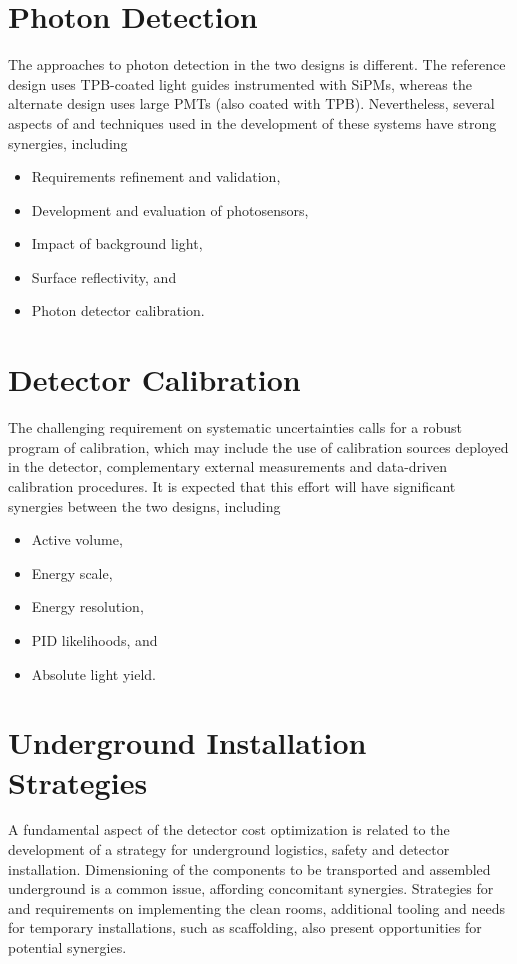  
\section{Photon Detection}

The approaches to photon detection in the two designs is
different.  The reference design uses TPB-coated light guides
instrumented with SiPMs, whereas the alternate design uses large PMTs
(also coated with TPB). Nevertheless, several aspects of and
techniques used in the development of these systems have strong synergies, including
\begin{itemize}
\item Requirements refinement and validation,
\item Development and evaluation of photosensors,
\item Impact of background light,
\item  Surface reflectivity, and
\item Photon detector calibration.
\end{itemize}


\section{Detector Calibration}

The challenging requirement on systematic uncertainties calls for a
robust program of calibration, which may include the use of calibration sources
deployed in the detector, complementary external measurements
and data-driven calibration procedures. It is expected that this effort
will have significant synergies between the two designs, including
\begin{itemize}
\item Active volume,
\item Energy scale,
\item Energy resolution,
\item PID likelihoods, and
\item Absolute light yield.
\end{itemize}


\section{Underground Installation Strategies}

A fundamental aspect of the detector cost optimization is related to
the development of a strategy for underground logistics, safety and detector
installation. Dimensioning of the components to be transported and
assembled underground is a common issue, affording concomitant synergies. 
Strategies for and requirements on implementing the clean
rooms, additional tooling and needs for temporary installations, such
as scaffolding, also present opportunities for potential synergies.

